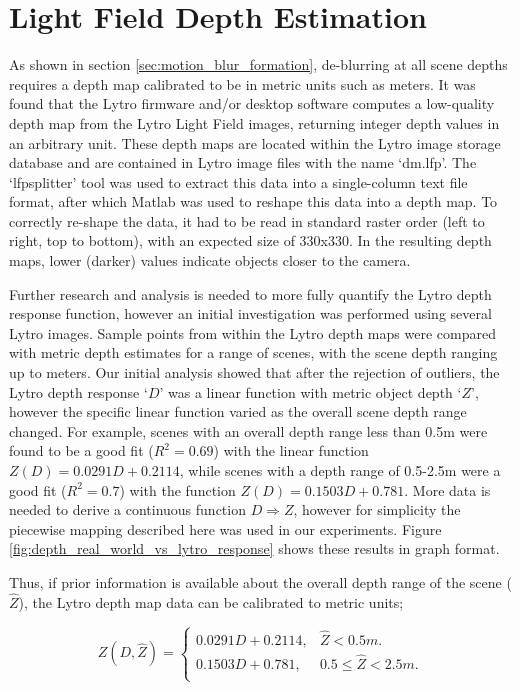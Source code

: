 \section{Light Field Depth Estimation}
\label{sec:light_field_depth_estimation}

As shown in section \ref{sec:motion_blur_formation}, de-blurring at all scene depths requires a depth map calibrated to be in metric units such as meters.
It was found that the Lytro firmware and/or desktop software computes a low-quality depth map from the Lytro Light Field images, returning integer depth values in an arbitrary unit.
These depth maps are located within the Lytro image storage database and are contained in Lytro image files with the name \enquote*{dm.lfp}.
The \enquote*{lfpsplitter} tool \cite{patel2013lfptools} was used to extract this data into a single-column text file format, after which Matlab was used to reshape this data into a depth map.
To correctly re-shape the data, it had to be read in standard raster order (left to right, top to bottom), with an expected size of 330x330.
In the resulting depth maps, lower (darker) values indicate objects closer to the camera.

Further research and analysis is needed to more fully quantify the Lytro depth response function, however an initial investigation was performed using several Lytro images.
Sample points from within the Lytro depth maps were compared with metric depth estimates for a range of scenes, with the scene depth ranging up to  meters.
Our initial analysis showed that after the rejection of outliers, the Lytro depth response \enquote*{$D$} was a linear function with metric object depth \enquote*{$Z$}, however the specific linear function varied as the overall scene depth range changed.
For example, scenes with an overall depth range less than 0.5m were found to be a good fit ($R^2 = 0.69$) with the linear function $Z(D) = 0.0291 D + 0.2114$, while scenes with a depth range of 0.5-2.5m were a good fit ($R^2 = 0.7$) with the function $Z(D) = 0.1503 D + 0.781$.
More data is needed to derive a continuous function $D \Rightarrow Z$, however for simplicity the piecewise mapping described here was used in our experiments.
Figure \ref{fig:depth_real_world_vs_lytro_response} shows these results in graph format.

Thus, if prior information is available about the overall depth range of the scene ($\hat{Z}$), the Lytro depth map data can be calibrated to metric units;

\begin{equation}
\label{eq:lytro_dm_to_metric}
Z(D, \hat{Z}) = \begin{cases}
	0.0291 D + 0.2114, & \hat{Z} < 0.5m. \\
	0.1503 D + 0.781, & 0.5 \leq \hat{Z} < 2.5m. \\
\end{cases}
\end{equation}

